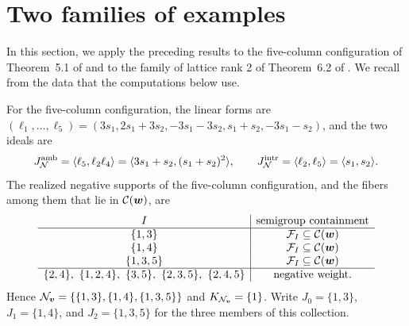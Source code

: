 \section{Two families of examples}
\label{sec:applications}

In this section, we apply the preceding results to the five-column configuration of Theorem~5.1 of \cite{Nak26} and to the family of lattice rank 2 of Theorem~6.2 of \cite{Nak26}.
We recall from \cite{Nak26} the data that the computations below use.

For the five-column configuration, the linear forms are \((\ell_1,\ldots,\ell_5)=(3s_1,2s_1+3s_2,-3s_1-3s_2,s_1+s_2,-3s_1-s_2)\), and the two ideals are
\begin{equation}
	J_{\mathcal N}^{\mathrm{amb}}=\langle\ell_5,\ell_2\ell_4\rangle=\langle3s_1+s_2,(s_1+s_2)^2\rangle, \qquad J_{\mathcal N}^{\mathrm{intr}}=\langle\ell_2,\ell_5\rangle=\langle s_1,s_2\rangle.
	\label{eq:five-column-ideals}
\end{equation}
The realized negative supports of the five-column configuration, and the fibers among them that lie in \(\mathcal C(\boldsymbol{w})\), are
\begin{equation}
	\begin{array}{c|c}
		I&\text{semigroup containment}\\ \hline
		\{1,3\}&\cF_I\subseteq\cC(\bw)\\
		\{1,4\}&\cF_I\subseteq\cC(\bw)\\
		\{1,3,5\}&\cF_I\subseteq\cC(\bw)\\ \hline
		\{2,4\},\ \{1,2,4\},\ \{3,5\},\ \{2,3,5\},\ \{2,4,5\}&\text{negative weight}.
	\end{array}
	\label{eq:five-column-supports}
\end{equation}
Hence \(\mathcal N_{\boldsymbol{v}}=\{\{1,3\},\{1,4\},\{1,3,5\}\}\) and \(K_{\mathcal N_{\boldsymbol{v}}}=\{1\}\).
Write \(J_0=\{1,3\}\), \(J_1=\{1,4\}\), and \(J_2=\{1,3,5\}\) for the three members of this collection.

